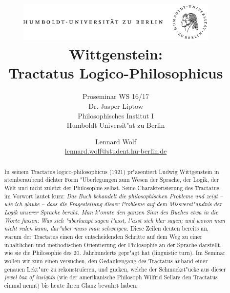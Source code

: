 \documentclass[]{scrartcl}
\begin{document}
\title{
	\includegraphics*[width=0.75\textwidth]{images/hu_logo.png}\\
	\vspace{24pt}
	Wittgenstein:\\Tractatus Logico-Philosophicus}
\subtitle{Proseminar WS 16/17\\
          Dr. Jasper Liptow\\
          Philosophisches Institut I \\ 
          Humboldt Universit"at zu Berlin}
\author{Lennard Wolf\\
        \href{mailto:lennard.wolf@student.hu-berlin.de}{lennard.wolf@student.hu-berlin.de}}
\maketitle
\begin{abstract}

In seinem Tractatus logico-philosophicus (1921) pr"asentiert Ludwig Wittgenstein in atemberaubend dichter Form "Uberlegungen zum Wesen der Sprache, der Logik, der Welt und nicht zuletzt der Philosophie selbst. Seine Charakterisierung des Tractatus im Vorwort lautet kurz: \emph{Das Buch behandelt die philosophischen Probleme und zeigt – wie ich glaube – dass die Fragestellung dieser Probleme auf dem Missverst"andnis der Logik unserer Sprache beruht. Man k"onnte den ganzen Sinn des Buches etwa in die Worte fassen: Was sich "uberhaupt sagen l"asst, l"asst sich klar sagen; und wovon man nicht reden kann, dar"uber muss man schweigen.} Diese Zeilen deuten bereits an, warum der Tractatus einen der entscheidenden Schritte auf dem Weg zu einer inhaltlichen und methodischen Orientierung der Philosophie an der Sprache darstellt, wie sie die Philosophie des 20. Jahrhunderts gepr"agt hat (linguistic turn). 
Im Seminar wollen wir zum einen versuchen, den Gedankengang des Tractatus anhand einer genauen Lekt"ure zu rekonstruieren, und gucken, welche der Schmuckst"ucke aus dieser \emph{jewel box of insights} (wie der amerikanische Philosoph Wilfrid Sellars den Tractatus einmal nennt) bis heute ihren Glanz bewahrt haben.


\end{abstract}
\newpage

\tableofcontents
\newpage
\end{document}
